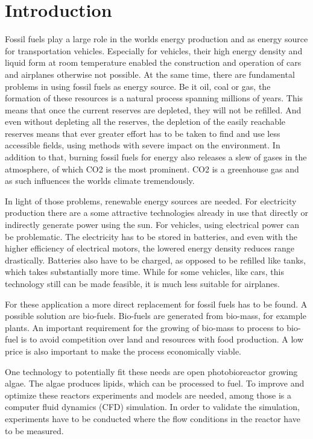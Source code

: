 \chapter{Introduction}

Fossil fuels play a large role in the worlds energy production and as energy source for transportation vehicles. Especially for vehicles, their high energy density and liquid form at room temperature enabled the construction and operation of cars and airplanes otherwise not possible.
At the same time, there are fundamental problems in using fossil fuels as energy source. Be it oil, coal or gas, the formation of these resources is a natural process spanning millions of years. This means that once the current reserves are depleted, they will not be refilled. And even without depleting all the reserves, the depletion of the easily reachable reserves means that ever greater effort has to be taken to find and use less accessible fields, using methods with severe impact on the environment.
In addition to that, burning fossil fuels for energy also releases a slew of gases in the atmosphere, of which CO2 is the most prominent. CO2 is a greenhouse gas and as such influences the worlds climate tremendously.

In light of those problems, renewable energy sources are needed. For electricity production there are a some attractive technologies already in use that directly or indirectly generate power using the sun. For vehicles, using electrical power can be problematic. The electricity has to be stored in batteries, and even with the higher efficiency of electrical motors, the lowered energy density reduces range drastically. Batteries also have to be charged, as opposed to be refilled like tanks, which takes substantially more time. While for some vehicles, like cars, this technology still can be made feasible, it is much less suitable for airplanes.

For these application a more direct replacement for fossil fuels has to be found. A possible solution are bio-fuels. Bio-fuels are generated from bio-mass, for example plants. An important requirement for the growing of bio-mass to process to bio-fuel is to avoid competition over land and resources with food production. A low price is also important to make the process economically viable.

One technology to potentially fit these needs are open photobioreactor growing algae. The algae produces lipids, which can be processed to fuel. To improve and optimize these reactors experiments and models are needed, among those is a computer fluid dynamics (CFD) simulation. In order to validate the simulation, experiments have to be conducted where the flow conditions in the reactor have to be measured.